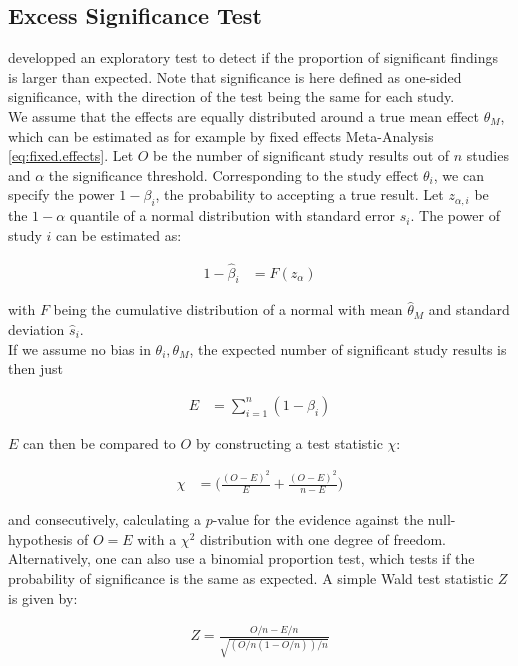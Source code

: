\documentclass[11pt,a4paper,twoside]{book}\usepackage[]{graphicx}\usepackage[]{color}
\begin{document}
\subsection{Excess Significance Test} \label{sec:excess.significance}
\citet{excess.significance} developped an exploratory test to detect if the proportion of significant findings is larger than expected. Note that significance is here defined as one-sided significance, with the direction of the test being the same for each study. \\
We assume that the effects are equally distributed around a true mean effect $\theta_M$, which can be estimated as for example by fixed effects Meta-Analysis \ref{eq:fixed.effects}. Let $O$ be the number of significant study results out of $n$ studies and $\alpha$ the significance threshold. Corresponding to the study effect $\theta_i$, we can specify the power $1 - \beta_i$, the probability to accepting a true result. Let $z_{\alpha,i}$ be the $1-\alpha$ quantile of a normal distribution with standard error $\hat{s}_i$. The power of study $i$ can be estimated as:

\begin{align}
1 - \hat{\beta}_i &= F(z_\alpha) 
\end{align}

with $F$ being the cumulative distribution of a normal with mean $\hat{\theta}_M$ and standard deviation $\hat{s}_i$. \\
If we assume no bias in $\theta_i, \theta_M$, the expected number of significant study results is then just

\begin{align}
E &= \sum_{i = 1}^n (1 - \beta_i) \nonumber
\end{align}

$E$ can then be compared to $O$ by constructing a test statistic $\chi$:

\begin{align}
\chi  &= \big( \frac{(O - E)^2}{E} + \frac{(O - E)^2}{n - E}\big) \nonumber
\end{align}

and consecutively, calculating a $p$-value for the evidence against the null-hypothesis of $O = E$ with a $\chi^2$ distribution with one degree of freedom. Alternatively, one can also use a binomial proportion test, which tests if the probability of significance is the same as expected. A simple Wald test statistic $Z$ is given by:

\begin{align}
Z = \frac{O/n - E/n}{\sqrt{(O/n(1-O/n))/n}}
\end{align}
\end{document}
